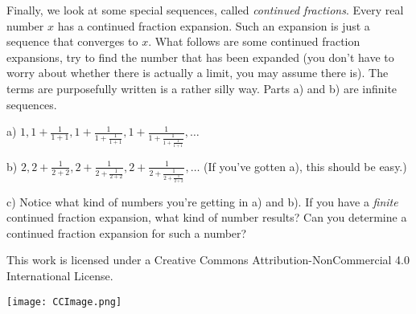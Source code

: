 \documentclass[12pt]{article}
\newcommand{\numb}[1]{\noindent{\bf #1)}}
\begin{document}
\newpage



\numb{5} Finally, we look at some special sequences, called \textit{continued fractions}. Every real number $x$ has a continued fraction expansion.  Such an expansion is just a sequence that converges to $x$. What follows are some continued fraction expansions, try to find the number that has been expanded (you don't have to worry about whether there is actually a limit, you may assume there is). The terms are purposefully written is a rather silly way. Parts a) and b) are infinite sequences. 

\bigskip 

a) $1, 1+\frac 1{1+1},1+\frac 1 {1+\frac 1 {1+1}},1+\frac 1 {1+\frac 1 {1+\frac 1 {1+1}}},\dots$ 

\bigskip

b) $2, 2+\frac 1 {2+2},2+\frac 1 {2+\frac 1 {2+2}},2+\frac 1 {2+\frac 1 {2+\frac 1 {2+2}}},\dots$ (If you've gotten a), this should be easy.)

\bigskip

c) Notice what kind of numbers you're getting in a) and b). If you have a \textit{finite} continued fraction expansion, what kind of number results? Can you determine a continued fraction expansion for such a number?

\newpage

\begin{mdframed}[outerlinecolor=black,outerlinewidth=2pt,linecolor=cccolor,middlelinewidth=3pt,roundcorner=10pt]
  This work is licensed under a Creative Commons Attribution-NonCommercial 4.0 International License.
  \begin{center}
    \texttt{[image: CCImage.png]}
  \end{center}
\end{mdframed}







\bigskip
\end{document}
